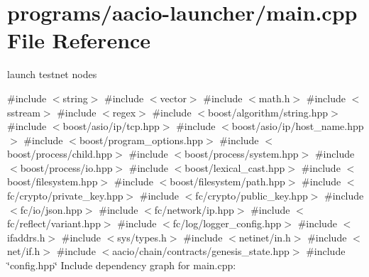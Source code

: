 \hypertarget{programs_2aacio-launcher_2main_8cpp}{}\section{programs/aacio-\/launcher/main.cpp File Reference}
\label{programs_2aacio-launcher_2main_8cpp}


launch testnet nodes  


{\ttfamily \#include $<$string$>$}\newline
{\ttfamily \#include $<$vector$>$}\newline
{\ttfamily \#include $<$math.\+h$>$}\newline
{\ttfamily \#include $<$sstream$>$}\newline
{\ttfamily \#include $<$regex$>$}\newline
{\ttfamily \#include $<$boost/algorithm/string.\+hpp$>$}\newline
{\ttfamily \#include $<$boost/asio/ip/tcp.\+hpp$>$}\newline
{\ttfamily \#include $<$boost/asio/ip/host\+\_\+name.\+hpp$>$}\newline
{\ttfamily \#include $<$boost/program\+\_\+options.\+hpp$>$}\newline
{\ttfamily \#include $<$boost/process/child.\+hpp$>$}\newline
{\ttfamily \#include $<$boost/process/system.\+hpp$>$}\newline
{\ttfamily \#include $<$boost/process/io.\+hpp$>$}\newline
{\ttfamily \#include $<$boost/lexical\+\_\+cast.\+hpp$>$}\newline
{\ttfamily \#include $<$boost/filesystem.\+hpp$>$}\newline
{\ttfamily \#include $<$boost/filesystem/path.\+hpp$>$}\newline
{\ttfamily \#include $<$fc/crypto/private\+\_\+key.\+hpp$>$}\newline
{\ttfamily \#include $<$fc/crypto/public\+\_\+key.\+hpp$>$}\newline
{\ttfamily \#include $<$fc/io/json.\+hpp$>$}\newline
{\ttfamily \#include $<$fc/network/ip.\+hpp$>$}\newline
{\ttfamily \#include $<$fc/reflect/variant.\+hpp$>$}\newline
{\ttfamily \#include $<$fc/log/logger\+\_\+config.\+hpp$>$}\newline
{\ttfamily \#include $<$ifaddrs.\+h$>$}\newline
{\ttfamily \#include $<$sys/types.\+h$>$}\newline
{\ttfamily \#include $<$netinet/in.\+h$>$}\newline
{\ttfamily \#include $<$net/if.\+h$>$}\newline
{\ttfamily \#include $<$aacio/chain/contracts/genesis\+\_\+state.\+hpp$>$}\newline
{\ttfamily \#include \char`\"{}config.\+hpp\char`\"{}}\newline
Include dependency graph for main.\+cpp\+:
